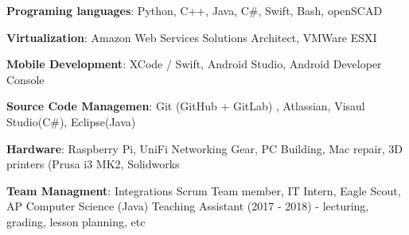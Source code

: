 

\begin{cventries}
\vspace{-5mm}
  \cventry
    {}
    {}
    {}
    {}
    {
      \begin{cvitems}
        \item {\textbf{Programing languages}: Python, C++, Java, C\#, Swift, Bash, openSCAD}
        \item {\textbf{Virtualization}: Amazon Web Services
            Solutions Architect, VMWare ESXI}
        \item {\textbf{Mobile Development}: XCode / Swift, Android
            Studio, Android Developer Console}
        \item {\textbf{Source Code Managemen}: Git (GitHub + GitLab) ,
            Atlassian, Visaul Studio(C\#), Eclipse(Java)}
        \item {\textbf{Hardware}: Raspberry Pi, UniFi Networking Gear,
            PC Building, Mac repair, 3D printers (Prusa i3 MK2,
            Solidworks}
        \item {\textbf{Team Managment}:  Integrations Scrum Team
            member, IT Intern, Eagle Scout, AP Computer Science (Java) Teaching
            Assistant (2017 - 2018) - lecturing, grading, lesson
            planning, etc}
      \end{cvitems}
    }
\end{cventries}